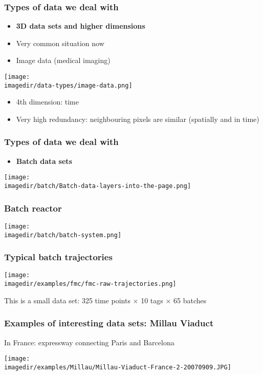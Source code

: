 \begin{frame}\frametitle{Types of data we deal with}
	\begin{itemize}
		\item	\textbf{3D data sets and higher dimensions}
	\end{itemize}
	\begin{itemize}
		\item	Very common situation now
		\item	Image data (medical imaging)
	\end{itemize}

	\texttt{[image: \\imagedir/data-types/image-data.png]}
	\begin{itemize}
		\item	4th dimension: time
		\item	Very high redundancy: neighbouring pixels are similar (spatially and in time)
	\end{itemize}
\end{frame}

\begin{frame}\frametitle{Types of data we deal with}
	\begin{itemize}
		\item	\textbf{Batch data sets}
	\end{itemize}

	\texttt{[image: \\imagedir/batch/Batch-data-layers-into-the-page.png]}
\end{frame}

\begin{frame}\frametitle{Batch reactor}

	\texttt{[image: \\imagedir/batch/batch-system.png]}
\end{frame}

\begin{frame}\frametitle{Typical batch trajectories}

	\texttt{[image: \\imagedir/examples/fmc/fmc-raw-trajectories.png]}
	
	This is a small data set: 325 time points $\times$ 10 tags $\times$ 65 batches
\end{frame}

\begin{frame}\frametitle{Examples of interesting data sets: Millau Viaduct}

	In France: expressway connecting Paris and Barcelona

	\texttt{[image: \\imagedir/examples/Millau/Millau-Viaduct-France-2-20070909.JPG]}
\end{frame}

